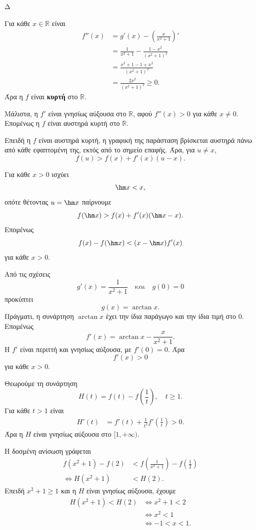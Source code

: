 \begin{thema}{Δ}
\begin{erwthma}
\item Για κάθε $x\in\mathbb{R}$ είναι
\begin{align*}
f''(x)
&=g'(x)-\left(\frac{x}{x^2+1}\right)'\\
&=\frac{1}{x^2+1}
-\frac{1-x^2}{(x^2+1)^2}\\
&=\frac{x^2+1-1+x^2}{(x^2+1)^2}\\
&=\frac{2x^2}{(x^2+1)^2}\geq0.
\end{align*}
Άρα η $f$ είναι \textbf{κυρτή} στο $\mathbb{R}$.

Μάλιστα, η $f'$ είναι γνησίως αύξουσα στο $\mathbb{R}$, αφού $f''(x)>0$ για κάθε $x\neq0$. Επομένως η $f$ είναι αυστηρά κυρτή στο $\mathbb{R}$.

\item Επειδή η $f$ είναι αυστηρά κυρτή, η γραφική της παράσταση βρίσκεται αυστηρά πάνω από κάθε εφαπτομένη της, εκτός από το σημείο επαφής. Άρα, για $u\neq x$,
\[
f(u)>f(x)+f'(x)(u-x).
\]

Για κάθε $x>0$ ισχύει
\[
\hm x<x,
\]
οπότε θέτοντας $u=\hm x$ παίρνουμε
\[
f(\hm x)>f(x)+f'(x)(\hm x-x).
\]
Επομένως
\[
{
f(x)-f(\hm x)
<(x-\hm x)f'(x)}
\]
για κάθε $x>0$.

\item Από τις σχέσεις
\[
g'(x)=\frac{1}{x^2+1}
\quad\text{και}\quad
g(0)=0
\]
προκύπτει
\[
g(x)=\arctan x.
\]
Πράγματι, η συνάρτηση $\arctan x$ έχει την ίδια παράγωγο και την ίδια τιμή στο $0$. Επομένως
\[
f'(x)=\arctan x-\frac{x}{x^2+1}.
\]
Η $f'$ είναι περιττή και γνησίως αύξουσα, με $f'(0)=0$. Άρα
\[
f'(x)>0
\]
για κάθε $x>0$.

Θεωρούμε τη συνάρτηση
\[
H(t)=f(t)-f\left(\frac{1}{t}\right),\quad t\geq1.
\]
Για κάθε $t>1$ είναι
\begin{align*}
H'(t)
&=f'(t)+\frac{1}{t^2}f'\left(\frac{1}{t}\right)>0.
\end{align*}
Άρα η $H$ είναι γνησίως αύξουσα στο $[1,+\infty)$.

Η δοσμένη ανίσωση γράφεται
\begin{align*}
f(x^2+1)-f(2)
&<f\left(\frac{1}{x^2+1}\right)-f\left(\frac{1}{2}\right)\\
\Leftrightarrow
H(x^2+1)&<H(2).
\end{align*}
Επειδή $x^2+1\geq1$ και η $H$ είναι γνησίως αύξουσα, έχουμε
\begin{align*}
H(x^2+1)<H(2)
&\Leftrightarrow x^2+1<2\\
&\Leftrightarrow x^2<1\\
&\Leftrightarrow {-1<x<1}.
\end{align*}


\end{erwthma}
\end{thema}
